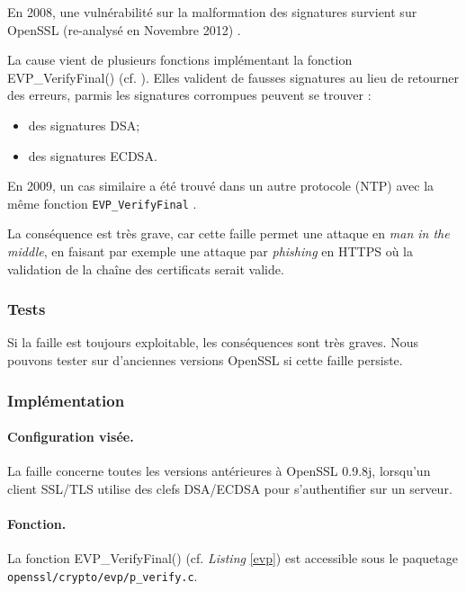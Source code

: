 		En 2008, une vulnérabilité sur la malformation des signatures survient sur OpenSSL (re-analysé en Novembre 2012) \cite{openssl2009secadv} \cite{cve-2008-5077}. 

		La cause vient de plusieurs fonctions implémentant la fonction EVP\_VerifyFinal() (cf. \textit{}). Elles valident de fausses signatures au lieu de retourner des erreurs, parmis les signatures corrompues peuvent se trouver :
		\begin{itemize}
		\item des signatures DSA;
		\item des signatures ECDSA.\\
		\end{itemize}

		En 2009, un cas similaire a été trouvé dans un autre protocole (NTP) avec la même fonction \texttt{EVP\_VerifyFinal} \cite{cve-2009-0021}.

		La conséquence est très grave, car cette faille permet une attaque en \textit{man in the middle}, en faisant par exemple une attaque par \textit{phishing} en HTTPS où la validation de la chaîne des certificats serait valide.

		\subsubsection{Tests}

		Si la faille est toujours exploitable, les conséquences sont très graves. Nous pouvons tester sur d'anciennes versions OpenSSL si cette faille persiste.
		
		\subsubsection{Implémentation}
			
			\paragraph{Configuration visée.\\}
			
			La faille concerne toutes les versions antérieures à OpenSSL 0.9.8j, lorsqu'un client SSL/TLS utilise des clefs DSA/ECDSA pour s'authentifier sur un serveur. 

			\paragraph{Fonction.\\}
			La fonction EVP\_VerifyFinal() (cf. \textit{Listing} \ref{evp}) est accessible sous le paquetage \texttt{openssl/crypto/evp/p\_verify.c}.
		
